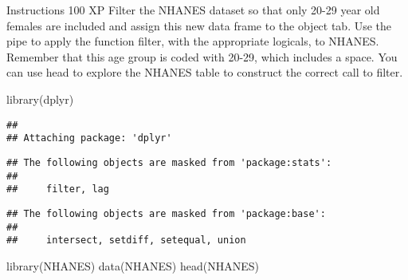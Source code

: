 \documentclass[
]{article}
\newenvironment{Shaded}{\begin{snugshade}}{\end{snugshade}}
\newcommand{\FunctionTok}[1]{\textcolor[rgb]{0.00,0.00,0.00}{#1}}
\newcommand{\NormalTok}[1]{#1}
\begin{document}
Instructions 100 XP Filter the NHANES dataset so that only 20-29 year
old females are included and assign this new data frame to the object
tab. Use the pipe to apply the function filter, with the appropriate
logicals, to NHANES. Remember that this age group is coded with 20-29,
which includes a space. You can use head to explore the NHANES table to
construct the correct call to filter.

\begin{Shaded}
\begin{Highlighting}[]
\FunctionTok{library}\NormalTok{(dplyr)}
\end{Highlighting}
\end{Shaded}

\begin{verbatim}
## 
## Attaching package: 'dplyr'
\end{verbatim}

\begin{verbatim}
## The following objects are masked from 'package:stats':
## 
##     filter, lag
\end{verbatim}

\begin{verbatim}
## The following objects are masked from 'package:base':
## 
##     intersect, setdiff, setequal, union
\end{verbatim}

\begin{Shaded}
\begin{Highlighting}[]
\FunctionTok{library}\NormalTok{(NHANES)}
\FunctionTok{data}\NormalTok{(NHANES)}
\FunctionTok{head}\NormalTok{(NHANES)}
\end{Highlighting}
\end{Shaded}
\end{document}
